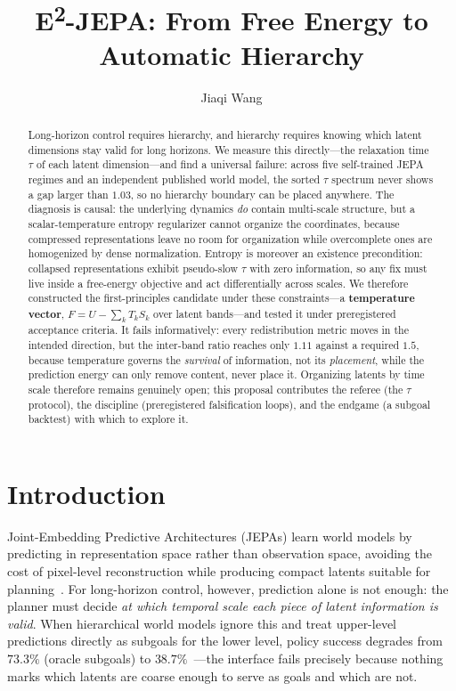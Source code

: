 \documentclass[11pt]{article}
\title{\textbf{E\textsuperscript{2}-JEPA: From Free Energy to Automatic Hierarchy}}
\author{Jiaqi Wang}
\affil{Eindhoven University of Technology \\ \texttt{ghazziwang2000@outlook.com}}
\date{}
\begin{document}
\maketitle

\begin{abstract}
Long-horizon control requires hierarchy, and hierarchy requires knowing which latent dimensions stay valid for long horizons. We measure this directly---the relaxation time $\tau$ of each latent dimension---and find a universal failure: across five self-trained JEPA regimes and an independent published world model, the sorted $\tau$ spectrum never shows a gap larger than $1.03$, so no hierarchy boundary can be placed anywhere. The diagnosis is causal: the underlying dynamics \emph{do} contain multi-scale structure, but a scalar-temperature entropy regularizer cannot organize the coordinates, because compressed representations leave no room for organization while overcomplete ones are homogenized by dense normalization. Entropy is moreover an existence precondition: collapsed representations exhibit pseudo-slow $\tau$ with zero information, so any fix must live inside a free-energy objective and act differentially across scales. We therefore constructed the first-principles candidate under these constraints---a \textbf{temperature vector}, $F = U - \sum_k T_k S_k$ over latent bands---and tested it under preregistered acceptance criteria. It fails informatively: every redistribution metric moves in the intended direction, but the inter-band ratio reaches only $1.11$ against a required $1.5$, because temperature governs the \emph{survival} of information, not its \emph{placement}, while the prediction energy can only remove content, never place it. Organizing latents by time scale therefore remains genuinely open; this proposal contributes the referee (the $\tau$ protocol), the discipline (preregistered falsification loops), and the endgame (a subgoal backtest) with which to explore it.
\end{abstract}

\section{Introduction}

Joint-Embedding Predictive Architectures (JEPAs) learn world models by predicting in representation space rather than observation space, avoiding the cost of pixel-level reconstruction while producing compact latents suitable for planning~\cite{lecun2022path,assran2023ijepa}. For long-horizon control, however, prediction alone is not enough: the planner must decide \emph{at which temporal scale each piece of latent information is valid}. When hierarchical world models ignore this and treat upper-level predictions directly as subgoals for the lower level, policy success degrades from $73.3\%$ (oracle subgoals) to $38.7\%$~\cite{hilewm2026}---the interface fails precisely because nothing marks which latents are coarse enough to serve as goals and which are not.
\end{document}
